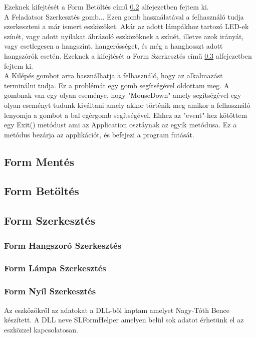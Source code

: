 \documentclass[tocnopagenum]{thesis-ekf}
\theoremstyle{definition}
\theoremstyle{remark}
\begin{document}
	Ezeknek kifejtését a Form Betöltés című \ref{Form Betoltes}
	alfejezetben fejtem ki.
	\\
	A Feladatsor Szerkesztés gomb...
	Ezen gomb használatával a felhasználó tudja szerkeszteni a már ismert eszközöket. Akár az adott lámpákhoz tartozó LED-ek színét, vagy adott nyilakat ábrázoló eszközöknek a színét, illetve azok irányát, vagy esetlegesen a hangszínt, hangerősséget, és még a hanghosszt adott hangszórók esetén.
	Ezeknek a kifejtését a Form Szerkesztés című \ref{Form Szerkesztes}	alfejezetben fejtem ki.
	\\
	A Kilépés gombot arra használhatja a felhasználó, hogy az alkalmazást terminálni tudja. Ez a problémát egy gomb segítségével oldottam meg. A gombnak van egy olyan eseménye, hogy "MouseDown" amely segítségével egy olyan eseményt tudunk kiváltani amely akkor történik meg amikor a felhasználó lenyomja a gombot a bal egérgomb segítségével.
	Ehhez az "event"-hez kötöttem egy Exit() metódust ami az Application osztáynak az egyik metódusa. Ez a metódus bezárja az applikációt, és befejezi a program futását. 
	\subsection{Form Mentés}
	\label{Form Mentes}
	
	\subsection{Form Betöltés}
	\label{Form Betoltes}
	\subsection{Form Szerkesztés}
	\label{Form Szerkesztes}
	\subsubsection{Form Hangszoró Szerkesztés}
	\subsubsection{Form Lámpa Szerkesztés}
	\subsubsection{Form Nyíl Szerkesztés}

	Az eszközökről az adatokat a DLL-ből kaptam amelyet Nagy-Tóth Bence készített. A DLL neve SLFormHelper amelyen belül sok adatot érhetünk el az eszközzel kapcsolatosan. %
	
\end{document}
